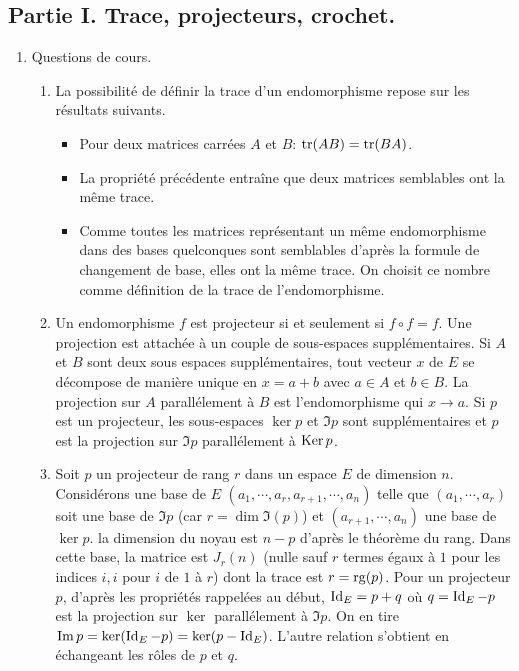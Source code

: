\subsection*{Partie I. Trace, projecteurs, crochet.}
\begin{enumerate}
  \item Questions de cours.
\begin{enumerate}
  \item  La possibilité de définir la trace d'un endomorphisme repose sur les résultats suivants.
\begin{itemize}
  \item Pour deux matrices carrées $A$ et $B$: $\operatorname{tr}(AB) = \operatorname{tr}(BA)$.
  \item La propriété précédente entraîne que deux matrices semblables ont la même trace.
  \item Comme toutes les matrices représentant un même endomorphisme dans des bases quelconques sont semblables d'après la formule de changement de base, elles ont la même trace. On choisit ce nombre comme définition de la trace de l'endomorphisme.
\end{itemize}

  \item Un endomorphisme $f$ est projecteur si et seulement si $f\circ f = f$.\newline
  Une projection est attachée à un couple de sous-espaces supplémentaires. Si $A$ et $B$ sont deux sous espaces supplémentaires, tout vecteur $x$ de $E$ se décompose de manière unique en $x=a+b$ avec $a\in A$ et $b\in B$. La projection sur $A$ parallélement à $B$ est l'endomorphisme qui $x \rightarrow a$.\newline
  Si $p$ est un projecteur, les sous-espaces $\ker p$ et $\Im p$ sont supplémentaires et $p$ est la projection sur $\Im p$ parallélement à $\operatorname{Ker} p$.
  
  \item Soit $p$ un projecteur de rang $r$ dans un espace $E$ de dimension $n$. Considérons une base de $E$ $(a_1,\cdots,a_r,a_{r+1},\cdots,a_n)$ telle que $(a_1,\cdots,a_r)$ soit une base de $\Im p$ (car $r=\dim \Im(p)$) et $(a_{r+1},\cdots,a_n)$ une base de $\ker p$. la dimension du noyau est $n-p$ d'après le théorème du rang. Dans cette base, la matrice est $J_r(n)$ (nulle sauf $r$ termes égaux à $1$ pour les indices $i,i$ pour $i$ de $1$ à $r$) dont la trace est $r=\operatorname{rg}(p)$.\newline
Pour un projecteur $p$, d'après les propriétés rappelées au début, $\operatorname{Id}_E = p + q$ où $q=\operatorname{Id}_E -p$ est la projection sur $\ker$ parallélement à $\Im p$. On en tire $\operatorname{Im} p = \ker(\operatorname{Id}_E -p) = \ker(p-\operatorname{Id}_E)$. L'autre relation s'obtient en échangeant les rôles de $p$ et $q$.
\end{enumerate}


\end{enumerate}
